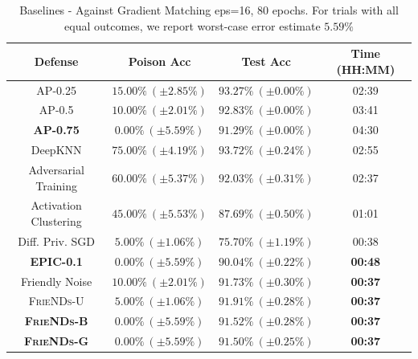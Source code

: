 \documentclass{article}
\newcommand{\alg}{\textsc{FrieNDs}}
\begin{document}
\begin{table}[t]
    \centering
    \caption{Baselines - Against Gradient Matching eps=16, 80 epochs. For trials with all equal outcomes, we report worst-case error estimate $5.59\%$}
    \begin{tabular}{c|ccc}
    \toprule
    Defense & Poison Acc & Test Acc & Time (HH:MM) \\  
    \midrule
    AP-0.25 \cite{geiping2021doesn} & $15.00\% \ (\pm 2.85\%)$ & $93.27\%\ (\pm 0.00\%)$ & 02:39 \\
    AP-0.5 \cite{geiping2021doesn}& $10.00\% \ (\pm 2.01\%)$ & $92.83\%\ (\pm 0.00\%)$ & 03:41 \\
    \textbf{AP-0.75} \cite{geiping2021doesn} & $\mathbf{0.00\% \ (\pm 5.59\%)}$ & $\mathbf{91.29\%\ (\pm 0.00\%)}$ & 04:30 \\
    DeepKNN \cite{peri2020deep} & $75.00\%\ (\pm 4.19\%)$ & $93.72\%\ (\pm 0.24\%)$ & 02:55 \\
    Adversarial Training \cite{madry2018towards} & $60.00\%\ (\pm 5.37\%)$ & $92.03\%\ (\pm 0.31\%)$  & 02:37 \\
    Activation Clustering \cite{chen2019detecting} & $45.00\%\ (\pm 5.53\%)$ & $87.69\%\ (\pm 0.50\%)$ & 01:01\\
    Diff. Priv. SGD \cite{hong2020effectiveness} & $5.00\%\ (\pm 1.06\%)$ & $75.70\%\ (\pm 1.19\%)$ & 00:38 \\
    \textbf{EPIC-0.1} \cite{yang2022not} & $\mathbf{0.00\% \ (\pm 5.59\%)}$ & $90.04\%\ (\pm 0.22\%)$ & \textbf{00:48} \\
    Friendly Noise & $10.00\% \ (\pm 2.01\%)$ & $91.73\%\ (\pm 0.30\%)$ & \textbf{00:37} \\
    \alg -U & $5.00\% \ (\pm 1.06\%)$ & $91.91\%\ (\pm 0.28\%)$ & \textbf{00:37} \\
    \textbf{\alg -B} & $\mathbf{0.00\% \ (\pm 5.59\%)}$ & $\mathbf{91.52\%\ (\pm 0.28\%)}$ & \textbf{00:37} \\
    \textbf{\alg -G} & $\mathbf{0.00\% \ (\pm 5.59\%)}$ & $\mathbf{91.50\%\ (\pm 0.25\%)}$ & \textbf{00:37} \\
    \bottomrule
    \end{tabular}
    \label{tab:wb16}
\end{table}
\end{document}
